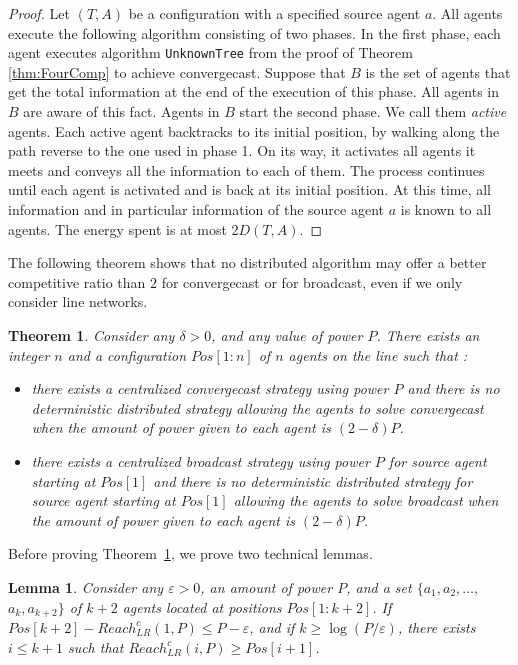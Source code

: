 \documentclass{article}
\newtheorem{lemma}{Lemma}
\newtheorem{theorem}{Theorem}
\newcommand\rclr{Reach_{LR}^c\xspace}
\newcommand\TwoAprTree{\mbox{{\tt UnknownTree}}\xspace}
\newcommand\convergecast{convergecast\xspace}
\newcommand\broadcast{broadcast\xspace}
\begin{document}
\begin{proof}
Let $(T,A)$ be a configuration with a specified source agent $a$. All agents execute the following algorithm consisting of two phases.
In the first phase, each agent executes algorithm \TwoAprTree from the proof of Theorem \ref{thm:FourComp} to achieve convergecast. Suppose that $B$ is the set of agents that get the total information at the end of the execution of this phase. All agents in $B$ are aware of this fact. Agents in $B$ start the second phase. We call them \emph{active} agents. 
Each active agent backtracks to its initial position, by walking along the path reverse to the one used in phase 1. On its way, it 
activates all agents it meets and conveys all the information to each of them. The process continues until each agent is activated and is back at its initial position. At this time, all information and in particular information of the source agent $a$ is known to all agents. The energy spent is at most $2D(T,A)$.
\end{proof}

The following theorem shows that no distributed algorithm may offer a
better competitive ratio than $2$ for convergecast or for broadcast, even if we only consider line networks. 

\begin{theorem}\label{thm:TwoAprOpt}
Consider any $\delta > 0$, and any value of power $P$. There exists an
integer $n$ and a configuration $Pos[1:n]$ of $n$ agents on the line
such that  :
\begin{itemize}
\item there exists a centralized {\convergecast} strategy using power $P$ and
there is no deterministic distributed strategy allowing the
agents to solve {\convergecast} when the amount of power given to each
agent is $(2-\delta)P$.
\item there exists a centralized {\broadcast} strategy using power $P$ for source agent starting at $Pos[1]$ 
and there is no deterministic distributed strategy for source agent starting at $Pos[1]$  allowing the
agents to solve {\broadcast} when the amount of power given to each
agent is $(2-\delta)P$.
\end{itemize}
\end{theorem}

Before proving Theorem~\ref{thm:TwoAprOpt}, we prove two technical lemmas.  

\begin{lemma}\label{lem-offline-group}
Consider any $\varepsilon > 0$, an amount of power $P$, and a
set $\{a_1, a_2, \ldots,$ $ a_k, a_{k+2}\}$ of $k+2$ agents located at
positions $Pos[1:k+2]$.  If $Pos[k+2]- \rclr(1,P) \leq P-\varepsilon$,
and if $k \geq \log(P/\varepsilon)$, there exists $i \leq k+1$ such
that $\rclr(i,P)\geq Pos[i+1]$.
\end{lemma}
\end{document}
